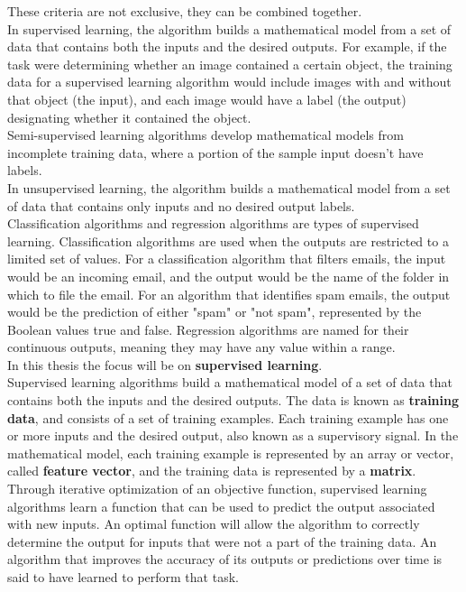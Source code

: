 These criteria are not exclusive, they can be combined together.
\\ \indent
In supervised learning, the algorithm builds a mathematical model from a set of data that contains both the inputs and the desired outputs. For example, if the task were determining whether an image contained a certain object, the training data for a supervised learning algorithm would include images with and without that object (the input), and each image would have a label (the output) designating whether it contained the object.
\\
Semi-supervised learning algorithms develop mathematical models from incomplete training data, where a portion of the sample input doesn't have labels.
\\
In unsupervised learning, the algorithm builds a mathematical model from a set of data that contains only inputs and no desired output labels.
\\ \indent
Classification algorithms and regression algorithms are types of supervised learning. Classification algorithms are used when the outputs are restricted to a limited set of values. For a classification algorithm that filters emails, the input would be an incoming email, and the output would be the name of the folder in which to file the email. For an algorithm that identifies spam emails, the output would be the prediction of either "spam" or "not spam", represented by the Boolean values true and false. Regression algorithms are named for their continuous outputs, meaning they may have any value within a range.
\\
In this thesis the focus will be on \textbf{supervised learning}.
\\ \indent
Supervised learning algorithms build a mathematical model of a set of data that contains both the inputs and the desired outputs. The data is known as \textbf{training data}, and consists of a set of training examples. Each training example has one or more inputs and the desired output, also known as a supervisory signal. In the mathematical model, each training example is represented by an array or vector, called \textbf{feature vector}, and the training data is represented by a \textbf{matrix}. Through iterative optimization of an objective function, supervised learning algorithms learn a function that can be used to predict the output associated with new inputs. An optimal function will allow the algorithm to correctly determine the output for inputs that were not a part of the training data. An algorithm that improves the accuracy of its outputs or predictions over time is said to have learned to perform that task.
